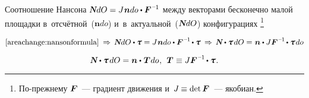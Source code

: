 \begin{otherlanguage}{russian}

Соотношение Нансона ${\mathboldN dO = J \hspace{.1ex} \bm{n} do \dotp \bm{F}^{\hspace{.1ex}\expminusone} \hspace{-0.1ex}}$ между векторами бесконечно малой площадки в~отсчётной~(${\bm{n} do}$) и~в~актуальной~(${\mathboldN dO}$) конфигурациях%
\footnote{По\hbox{-}прежнему ${\bm{F}\hspace{-0.12ex}}$~--- градиент движения и~${J \hspace{-0.1ex} \equiv \operatorname{det} \bm{F}\hspace{-0.12ex}}$~--- якобиан.}

\nopagebreak\vspace{-0.12em}\begin{equation*}
\eqref{areachange:nansonformula}
\:\Rightarrow\,
\mathboldN dO \dotp \cauchystress
= J \hspace{.1ex} \bm{n} do \dotp \bm{F}^{\hspace{.1ex}\expminusone} \hspace{-0.2ex} \dotp \cauchystress
\:\Rightarrow\,
\mathboldN \dotp \cauchystress \hspace{.25ex} dO
= \hspace{.1ex} \bm{n} \dotp J \bm{F}^{\hspace{.1ex}\expminusone} \hspace{-0.2ex} \dotp \cauchystress \hspace{.2ex} do
\end{equation*}

\vspace{-0.2em} \noindent {}

\nopagebreak\vspace{-0.16em}\begin{equation}\label{dualexpressionofsurfaceforce}
\mathboldN \dotp \cauchystress \hspace{.25ex} dO
= \bm{n} \dotp \hspace{.12ex} \firstpiolakirchhoffstress \hspace{.1ex} do
\hspace{.1ex}, \:\:
\firstpiolakirchhoffstress \hspace{.1ex} \equiv J \bm{F}^{\hspace{.1ex}\expminusone} \hspace{-0.2ex} \dotp \cauchystress \hspace{.1ex}.
\end{equation}


\end{otherlanguage}
